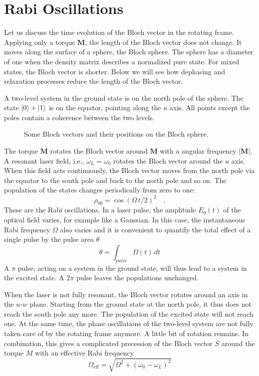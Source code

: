 \section{Rabi Oscillations}

Let us discuss the time evolution of the Bloch vector in the rotating frame. Applying only a torque $\boldsymbol{M}$, the length of the Bloch vector does not change. It moves along the surface of a sphere, the Bloch sphere. The sphere has a diameter of one when the density matrix describes a normalized pure state. For mixed states, the Bloch vector is shorter. Below we will see how dephasing and relaxation processes reduce the length of the Bloch vector.


A two-level system in the ground state is on the north pole of the sphere. The state $\ket{0} + \ket{1}$ is on the equator, pointing along the $u$ axis. All points except the poles contain a coherence between the two levels.


\begin{figure}
\caption{Some Bloch vectors and their positions on the Bloch sphere.}
\end{figure}


The torque $\boldsymbol{M}$ rotates the Bloch vector around  $\boldsymbol{M}$ with a angular frequency  $|\boldsymbol{M}|$. A resonant laser field, i.e., $\omega_L = \omega_0$ rotates the Bloch vector around the $u$ axis. When this field acts continuously, the Bloch vector moves from the north pole via the equator to the south pole and back to the north pole and so on. The population of the states changes periodically from zero to one:
\[
 \rho_{00} = \cos ( \Omega \, t / 2)^2 \quad .
\]
These are the Rabi oscillations. In a laser pulse, the amplitude $E_0(t)$ of the optical field varies, for example like a Gaussian. In this case, the instantaneous Rabi frequency $\Omega$ also varies and it is convenient to quantify the total effect of a single pulse by the pulse area $\theta$
\[
 \theta = \int_{pulse} \Omega (t) \, dt
\]
A $\pi$ pulse, acting on a system in the ground state, will thus lead to a system in the excited state. A $2\pi$ pulse leaves the populations unchanged.



When the laser is not fully resonant, the Bloch vector rotates around an axis in the $u$-$w$ plane. Starting from the ground state at the north pole, it thus does not reach the south pole any more. The population of the excited state will  not reach one. At the same time, the phase oscillations of the two-level system are not fully taken care of by the rotating frame anymore. A little bit of rotation remains. In combination, this gives a complicated precession of the Bloch vector $S$ around the torque $M$ with an effective Rabi frequency 
\[
 \Omega_\text{eff} = \sqrt{\Omega^2 + (\omega_0 - \omega_L)^2 }
\]

